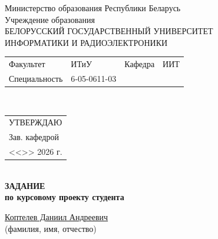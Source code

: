 {
  \thispagestyle{empty}
  \setlength{\parindent}{0em}

  \newcommand{\lineunderscore}{\uline{\hspace*{\fill}}}

  \begin{center}
    Министерство образования Республики Беларусь\\
    Учреждение образования\\
    БЕЛОРУССКИЙ ГОСУДАРСТВЕННЫЙ УНИВЕРСИТЕТ \\
    ИНФОРМАТИКИ И РАДИОЭЛЕКТРОНИКИ\\[1em]
  

  \begin{minipage}{\textwidth}
    \begin{flushleft}
      \begin{tabular}{ p{}p{}p{}p{} @{} }
        Факультет & ИТиУ & Кафедра & ИИТ \\
        Специальность   & 6‑05-0611-03
      \end{tabular}
    \end{flushleft}
  \end{minipage}\\[1em]

  \begin{minipage}{\textwidth}
    \begin{flushright}
      \begin{tabular}{p{}}
        УТВЕРЖДАЮ \\[0.5em]
        \underline{\hspace*{6em}} Зав. кафедрой \\
        
        <<\underline{\hspace*{4ex}}>> \underline{\hspace*{7em}} 2026 г.
      \end{tabular}
    \end{flushright}
  \end{minipage}\\[1em]

  \textbf{ЗАДАНИЕ} \\
  \textbf{по курсовому проекту студента}

  \lineunderscore\uline{Коптелев Даниил Андреевич}\lineunderscore \\
  {\small (фамилия, имя, отчество) }


\end{center}}
